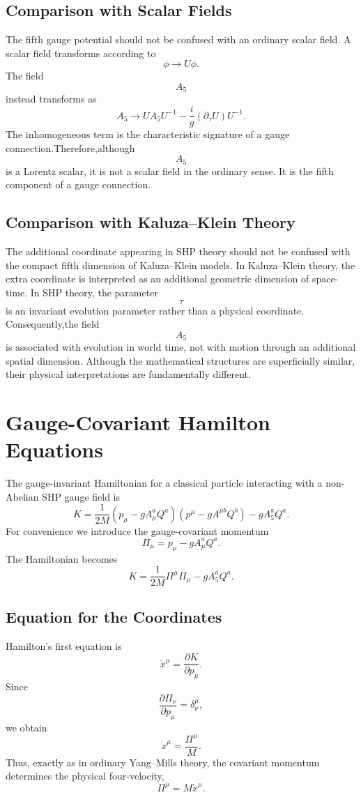 \subsection{Comparison with Scalar Fields}
The fifth gauge potential should not be confused with an ordinary scalar
field.
A scalar field transforms according to
\[\phi\rightarrow U\phi.\]
The field
\[A_5\]
instead transforms as
\[A_5\rightarrow UA_5U^{-1}-\frac{i}{g}(\partial_\tau U)U^{-1}.\]
The inhomogeneous term is the characteristic signature of a gauge
connection.Therefore,although
\[A_5\]
is a Lorentz scalar,
it is not a scalar field in the ordinary sense.
It is the fifth component of a gauge connection.
\subsection{Comparison with Kaluza--Klein Theory}
The additional coordinate appearing in SHP theory should not be confused
with the compact fifth dimension of Kaluza--Klein models.
In Kaluza--Klein theory,
the extra coordinate is interpreted as an additional geometric dimension
of space-time.
In SHP theory,
the parameter
\[\tau\]
is an invariant evolution parameter rather than a physical coordinate.
Consequently,the field
\[A_5\]
is associated with evolution in world time,
not with motion through an additional spatial dimension.
Although the mathematical structures are superficially similar,
their physical interpretations are fundamentally different.
\section{Gauge-Covariant Hamilton Equations}
The gauge-invariant Hamiltonian for a classical particle interacting
with a non-Abelian SHP gauge field is
\[\boxed{K=\frac{1}{2M}\left(p_\mu-gA_\mu^aQ^a\right)\left(p^\mu
-gA^{\mu b}Q^b\right)-gA_5^aQ^a.}\]
For convenience we introduce the gauge-covariant momentum
\[\boxed{\Pi_\mu=p_\mu-gA_\mu^aQ^a.}\]
The Hamiltonian becomes
\[\boxed{K=\frac{1}{2M}\Pi^\mu\Pi_\mu-gA_5^aQ^a.}\]
\subsection{Equation for the Coordinates}
Hamilton's first equation is
\[\dot x^\mu=\frac{\partial K}{\partial p_\mu}.\]
Since
\[\frac{\partial\Pi_\nu}{\partial p_\mu}=\delta^\mu_\nu,\]
we obtain
\[\boxed{\dot x^\mu=\frac{\Pi^\mu}{M}.}\]
Thus,
exactly as in ordinary Yang--Mills theory,
the covariant momentum determines the physical four-velocity,
\[\boxed{\Pi^\mu=M\dot x^\mu.}\]
